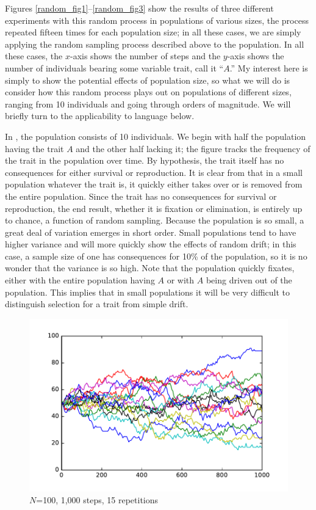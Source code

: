 \documentclass[output=paper]{langsci/langscibook}
\begin{document}
Figures \ref{random_fig1}--\ref{random_fig3} show the results of three
different experiments with this random process in populations of
various sizes, the process repeated fifteen times for each population
size; in all these cases, we are simply applying the random sampling
process described above to the population.  In all these cases, the
$x$-axis shows the number of steps and the $y$-axis shows the
number of individuals bearing some variable trait, call it
``$A$.''  My interest here is simply to show the potential effects of
population size, so what we will do is consider how this random
process plays out on populations of different sizes, ranging from 10
individuals and going through orders of magnitude.  We will briefly
turn to the applicability to language below.

In , the population consists of 10 individuals.
We begin with half the population having the trait $A$ and the other
half lacking it; the figure tracks the frequency of the trait in the
population over time.  By hypothesis, the trait itself has no
consequences for either survival or reproduction.  It is clear from
 that in a small population whatever the trait
is, it quickly either takes over or is removed from the entire
population.  Since the trait has no consequences for survival or
reproduction, the end result, whether it is fixation or elimination,
is entirely up to chance, a function of random sampling.  Because the
population is so small, a great deal of variation emerges in short
order.  Small populations tend to have higher variance and will more
quickly show the effects of random drift; in this case, a sample size
of one has consequences for 10\% of the population, so it is no wonder
that the variance is so high.  Note that the population quickly
fixates, either with the entire population having $A$ or with $A$
being driven out of the population.  This implies that in small
populations it will be very difficult to distinguish selection for a
trait from simple drift.

\begin{figure}[h]
   \centering
    \includegraphics[width=.8\linewidth]{./img/pop100_1000.pdf}
    \caption{$N$=100, 1,000 steps, 15 repetitions}
    \label{random_fig2}
\end{figure}
\end{document}
